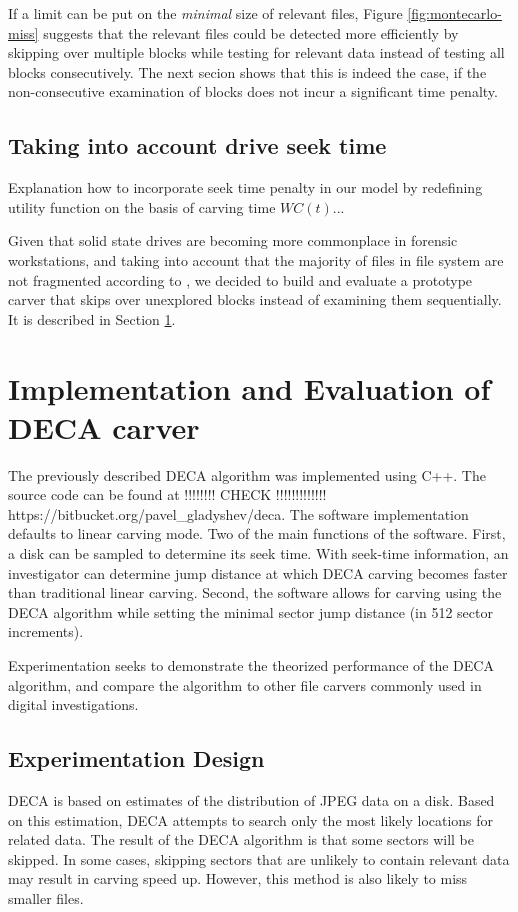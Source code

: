 \documentclass[10pt,a4paper]{article}
\begin{document}
If a limit can be put on the \emph{minimal} size of relevant files, Figure \ref{fig:montecarlo-miss} suggests that the relevant files could be detected more efficiently by skipping over multiple blocks while testing for relevant data instead of testing all blocks consecutively. The next secion shows that this is indeed the case, if the non-consecutive examination of blocks does not incur a significant time penalty.

\subsection{Taking into account drive seek time}



Explanation how to incorporate seek time penalty in our model by redefining utility function on the basis of carving time $WC(t)$...


Given that solid state drives are becoming more commonplace in forensic workstations, and taking into account that the majority of files in file system are not fragmented according to \cite{garfinkel2007carving}, we decided to build and evaluate a prototype carver that skips over unexplored blocks instead of examining them sequentially. It is described in Section \ref{sec:implement}.

\section{Implementation and Evaluation of DECA carver} \label{sec:implement}
The previously described DECA algorithm was implemented using C++. The source code can be found at !!!!!!!! CHECK !!!!!!!!!!!!! https://bitbucket.org/pavel\_gladyshev/deca. The software implementation defaults to linear carving mode. Two of the main functions of the software. First, a disk can be sampled to determine its seek time. With seek-time information, an investigator can determine jump distance at which DECA carving becomes faster than traditional linear carving. Second, the software allows for carving using the DECA algorithm while setting the minimal sector jump distance (in 512 sector increments).

Experimentation seeks to demonstrate the theorized performance of the DECA algorithm, and compare the algorithm to other file carvers commonly used in digital investigations.

\subsection{Experimentation Design}
DECA is based on estimates of the distribution of JPEG data on a disk. Based on this estimation, DECA attempts to search only the most likely locations for related data. The result of the DECA algorithm is that some sectors will be skipped. In some cases, skipping sectors that are unlikely to contain relevant data may result in carving speed up. However, this method is also likely to miss smaller files.
\end{document}
